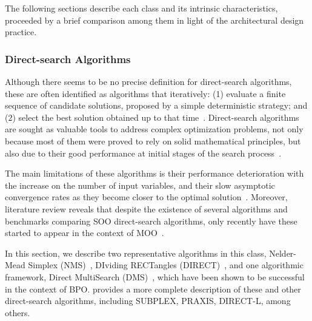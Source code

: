 	The following sections describe each class and its intrinsic characteristics, proceeded by a brief comparison among them in light of the architectural design practice. 	
	
	\subsubsection{Direct-search Algorithms}
	\label{ssec:direct-search}
	
	Although there seems to be no precise definition for direct-search algorithms, these are often identified as algorithms that iteratively: (1) evaluate a finite sequence of candidate solutions, proposed by a simple deterministic strategy; and (2) select the best solution obtained up to that time~\cite{Kolda2003,Conn2009}. Direct-search algorithms are sought as valuable tools to address complex optimization problems, not only because most of them were proved to rely on solid mathematical principles, but also due to their good performance at initial stages of the search process~\cite{Rios2013}. 
	
	The main limitations of these algorithms is their performance deterioration with the increase on the number of input variables, and their slow asymptotic convergence rates as they become closer to the optimal solution~\cite{Kolda2003}. Moreover, literature review reveals that despite the existence of several algorithms and benchmarks comparing \ac{SOO} direct-search algorithms, only recently have these started to appear in the context of \ac{MOO}~\cite{Custodio2010,Custodio2018}. 
	
	In this section, we describe two representative algorithms in this class, Nelder-Mead Simplex (NMS)~\cite{Nelder1964}, DIviding RECTangles (DIRECT)~\cite{Jones1993DIRECT}, and one algorithmic framework, Direct MultiSearch (DMS)~\cite{Custodio2010}, which have been shown to be successful in the context of \ac{BPO}.  provides a more complete description of these and other direct-search algorithms, including SUBPLEX, PRAXIS, DIRECT-L, among others.
	
